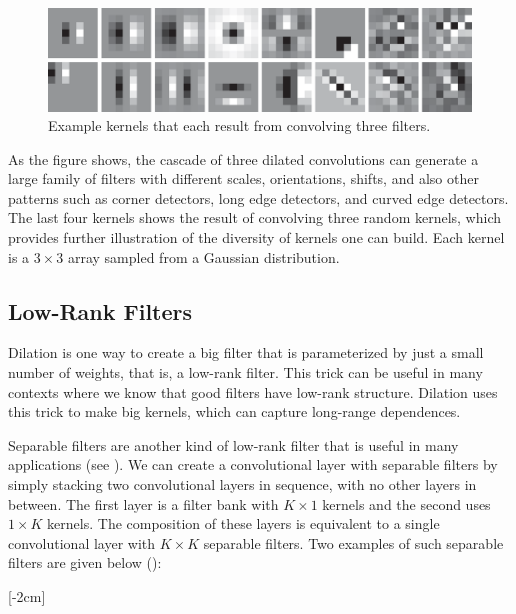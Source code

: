 \begin{figure}[h]
\centerline{
    \includegraphics[width=1\linewidth]{./figures/convolutional_neural_nets/dilated_examples.eps}}
    \caption{Example kernels that each result from convolving three filters.}
    \label{fig:convolutional_neural_nets:kernels_resulting_from_dilated_filters}
\end{figure}

As the figure shows, the cascade of three dilated convolutions can generate a large family of filters with different scales, orientations, shifts, and also other patterns such as corner detectors, long edge detectors, and curved edge detectors. The last four kernels shows the result of convolving three random kernels, which provides further illustration of the diversity of kernels one can build. Each kernel is a $3 \times 3$ array sampled from a Gaussian distribution. 

\subsection{Low-Rank Filters}
Dilation is one way to create a big filter that is parameterized by just a small number of weights, that is, a low-rank filter. This trick can be useful in many contexts where we know that good filters have low-rank structure. Dilation uses this trick to make big kernels, which can capture long-range dependences.

Separable filters are another kind of low-rank filter that is useful in many applications (see \chap{\ref{chapter:fourier_analysis}}). We can create a convolutional layer with separable filters by simply stacking two convolutional layers in sequence, with no other layers in between. The first layer is a filter bank with $K \times 1$ kernels and the second uses $1 \times K$ kernels. The composition of these layers is equivalent to a single convolutional layer with $K \times K$ separable filters. Two examples of such separable filters are given below (\fig{\ref{fig:convolutional_neural_nets:kernels_separable_aprox}}):

[-2cm]

